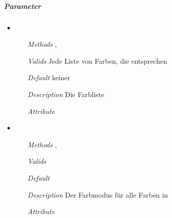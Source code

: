
\subparagraph{Parameter}
\begin{itemize}
\item {}
\begin{enumerate}
\item[\textit{Methods}] ,
\item[\textit{Valids}] Jede Liste von Farben, die 
 entsprechen
\item[\textit{Default}] keiner
\item[\textit{Description}] Die Farbliste
\item[\textit{Attribute}] 
\end{enumerate}

\item {}
\begin{enumerate}
\item[\textit{Methods}]
,
\item[\textit{Valids}] 
\item[\textit{Default}] 
\item[\textit{Description}] Der Farbmodus f\"ur alle Farben in
\item[\textit{Attribute}] 
\end{enumerate}

\end{itemize}


\newpage

